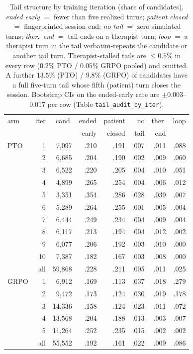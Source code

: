 \begin{table}[t]
  \centering\footnotesize
  \setlength{\tabcolsep}{3pt}
  \begin{tabular}{@{}lrrrrrrr@{}}
    \toprule
    arm & iter & cand. & ended & patient & no & ther. & loop \\
        &      &       & early & closed  & tail & end  &  \\
    \midrule
    PTO \Kf{}  & 1  & 7,097 & .210 & .191 & .007 & .011 & .088 \\
               & 2  & 6,685 & .204 & .190 & .002 & .009 & .060 \\
               & 3  & 6,522 & .220 & .205 & .004 & .010 & .051 \\
               & 4  & 4,899 & .265 & .254 & .004 & .006 & .012 \\
               & 5  & 3,351 & .354 & .286 & .028 & .039 & .007 \\
               & 6  & 5,289 & .264 & .255 & .001 & .005 & .004 \\
               & 7  & 6,444 & .249 & .234 & .004 & .009 & .004 \\
               & 8  & 6,117 & .213 & .194 & .004 & .012 & .002 \\
               & 9  & 6,077 & .206 & .192 & .003 & .010 & .000 \\
               & 10 & 7,387 & .182 & .167 & .003 & .008 & .000 \\
               & all & 59,868 & .228 & .211 & .005 & .011 & .025 \\
    \midrule
    GRPO \Kf{} & 1  & 6,912 & .169 & .113 & .037 & .018 & .279 \\
               & 2  & 9,472 & .173 & .124 & .030 & .019 & .178 \\
               & 3  & 14,336 & .158 & .124 & .023 & .011 & .072 \\
               & 4  & 13,568 & .204 & .188 & .013 & .003 & .007 \\
               & 5  & 11,264 & .252 & .235 & .015 & .002 & .002 \\
               & all & 55,552 & .192 & .161 & .022 & .009 & .086 \\
    \bottomrule
  \end{tabular}
  \caption{Tail structure by training iteration (share of candidates). \emph{ended early}
    $=$ fewer than five realized turns; \emph{patient closed} $=$ fingerprinted session end;
    \emph{no tail} $=$ zero simulated turns; \emph{ther.\ end} $=$ tail ends on a therapist
    turn; \emph{loop} $=$ a therapist turn in the tail verbatim-repeats the candidate or
    another tail turn. Therapist-stalled tails are $\leq 0.5\%$ in every row ($0.2\%$ PTO /
    $0.05\%$ GRPO pooled) and omitted. A
    further $13.5\%$ (PTO) / $9.8\%$ (GRPO) of candidates have a full five-turn tail whose
    fifth (patient) turn closes the session. Bootstrap CIs on the ended-early rate are
    $\pm 0.003$--$0.017$ per row (Table \texttt{tail\_audit\_by\_iter}).}
  \label{tab:tail_by_iter}
\end{table}


